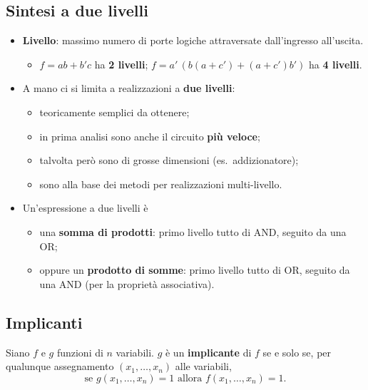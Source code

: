 \documentclass[12pt, a4paper]{article}
\begin{document}
\subsection{Sintesi a due livelli}

\begin{itemize}
    \item \textbf{Livello}: massimo numero di porte logiche attraversate dall'ingresso all'uscita.
    \begin{itemize}
        \item $f = ab + b'c$ ha \textbf{2 livelli}; $f = a'\,(b(a+c') + (a+c')b')$ ha \textbf{4 livelli}.
    \end{itemize}
    \item A mano ci si limita a realizzazioni a \textbf{due livelli}:
    \begin{itemize}
        \item teoricamente semplici da ottenere;
        \item in prima analisi sono anche il circuito \textbf{più veloce};
        \item talvolta però sono di grosse dimensioni (es.\ addizionatore);
        \item sono alla base dei metodi per realizzazioni multi-livello.
    \end{itemize}
    \item Un'espressione a due livelli è
    \begin{itemize}
        \item una \textbf{somma di prodotti}: primo livello tutto di AND, seguito da una OR;
        \item oppure un \textbf{prodotto di somme}: primo livello tutto di OR, seguito da una AND (per la proprietà associativa).
    \end{itemize}
\end{itemize}

\subsection{Implicanti}

\begin{tcolorbox}[colback=blue!5!white, colframe=blue!60!black, title=\textbf{Implicante}]
Siano $f$ e $g$ funzioni di $n$ variabili. $g$ è un \textbf{implicante} di $f$ se e solo se, per qualunque assegnamento $(x_1, \dots, x_n)$ alle variabili,
$$\text{se } g(x_1, \dots, x_n) = 1 \text{ allora } f(x_1, \dots, x_n) = 1.$$
\end{tcolorbox}
\end{document}
